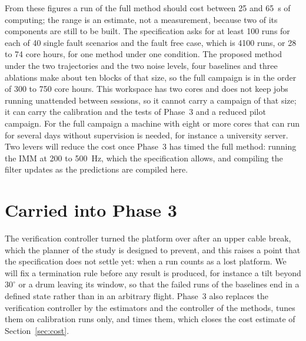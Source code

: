 \documentclass[10pt]{article}
\begin{document}
From these figures a run of the full method should cost between 25 and 65~s of computing; the range is an estimate, not a measurement, because two of its components are still to be built. The specification asks for at least 100 runs for each of 40 single fault scenarios and the fault free case, which is 4100 runs, or 28 to 74 core hours, for one method under one condition. The proposed method under the two trajectories and the two noise levels, four baselines and three ablations make about ten blocks of that size, so the full campaign is in the order of 300 to 750 core hours. This workspace has two cores and does not keep jobs running unattended between sessions, so it cannot carry a campaign of that size; it can carry the calibration and the tests of Phase~3 and a reduced pilot campaign. For the full campaign a machine with eight or more cores that can run for several days without supervision is needed, for instance a university server. Two levers will reduce the cost once Phase~3 has timed the full method: running the IMM at 200 to 500~Hz, which the specification allows, and compiling the filter updates as the predictions are compiled here.

\section{Carried into Phase 3}\label{sec:next}

The verification controller turned the platform over after an upper cable break, which the planner of the study is designed to prevent, and this raises a point that the specification does not settle yet: when a run counts as a lost platform. We will fix a termination rule before any result is produced, for instance a tilt beyond $30^\circ$ or a drum leaving its window, so that the failed runs of the baselines end in a defined state rather than in an arbitrary flight. Phase~3 also replaces the verification controller by the estimators and the controller of the methods, tunes them on calibration runs only, and times them, which closes the cost estimate of Section~\ref{sec:cost}.



\end{document}
